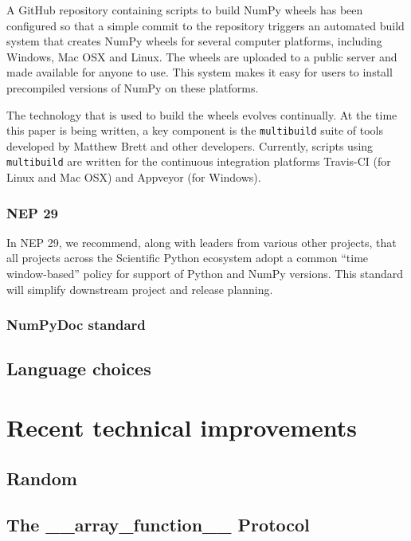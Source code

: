 \documentclass[fleqn,10pt]{wlscirep}
\newcommand{\code}[1]{\texttt{#1}}
\begin{document}
A GitHub repository containing scripts to build NumPy wheels has
been configured so that a simple commit to the repository triggers
an automated build system that creates NumPy wheels for several
computer platforms, including Windows, Mac OSX and Linux.  The wheels
are uploaded to a public server and made available for anyone to use.
This system makes it easy for users to install precompiled versions
of NumPy on these platforms.

The technology that is used to build the wheels evolves continually.
At the time this paper is being written, a key component is the
\code{multibuild} suite of tools developed by Matthew Brett and
other developers\cite{multibuild}.  Currently, scripts using
\code{multibuild} are written for the continuous integration
platforms Travis-CI (for Linux and Mac OSX) and Appveyor
(for Windows).


\subsubsection*{NEP 29}

In NEP 29, we recommend, along with leaders from various other
projects, that all projects across the Scientific Python ecosystem
adopt a common ``time window-based'' policy for support of Python and
NumPy versions. This standard will simplify downstream project and
release planning.

\subsubsection*{NumPyDoc standard}


\subsection*{Language choices}

\section*{Recent technical improvements}

\subsection*{Random}

\subsection*{The \_\_array\_function\_\_ Protocol}
\end{document}
